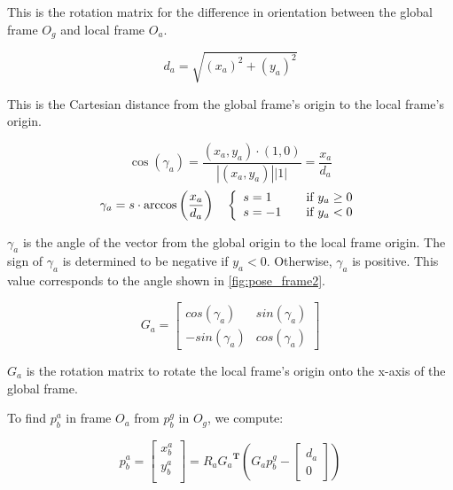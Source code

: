 This is the rotation matrix for the difference in orientation between the global frame $O_g$ and local frame $O_a$.


\begin{equation}
\label{equ:coord2}
d_a = \sqrt{(x_a)^2 + (y_a)^2} 
\end{equation}


This is the Cartesian distance from the global frame's origin to the local frame's origin.


\begin{equation}
\cos(\gamma_a) = \frac{(x_a,y_a) \cdot (1,0)}{|(x_a, y_a)| |1|} = \frac{x_a}{d_a} 
\end{equation}
\begin{equation}
\label{equ:coord3}
\gamma_a = s \cdot \arccos \left( \frac{x_a}{d_a} \right) 
\quad
\left\{ 
  \begin{array}{l l}
    s = 1 & \quad \text{if $y_a \geq 0$}\\
    s = -1 & \quad \text{if $y_a < 0$}
  \end{array} \right.
\end{equation}


$\gamma_a$ is the angle of the vector from the global origin to the local frame origin. The sign of $\gamma_a$ is determined to be negative if $y_a < 0$. Otherwise, $\gamma_a$ is positive. This value corresponds to the angle shown in \autoref{fig:pose_frame2}.


\begin{equation}
\label{equ:coord4}
G_a = 
\begin{bmatrix}
cos(\gamma_a) & sin(\gamma_a) \\
-sin(\gamma_a) & cos(\gamma_a)
\end{bmatrix}
\end{equation}


$G_a$ is the rotation matrix to rotate the local frame's origin onto the x-axis of the global frame.

To find $p_b^a$ in frame $O_a$ from $p_b^g$ in $O_g$, we compute:


\begin{equation}
\label{equ:g_to_c_cart}
p_b^a =
\begin{bmatrix}
x_b^a \\
y_b^a \\
\end{bmatrix}
 = R_a {G_a}^{\mathbf{T}} \left(G_a p_b^g 
-
\begin{bmatrix}
d_a \\
0
\end{bmatrix}
\right)
\end{equation}


